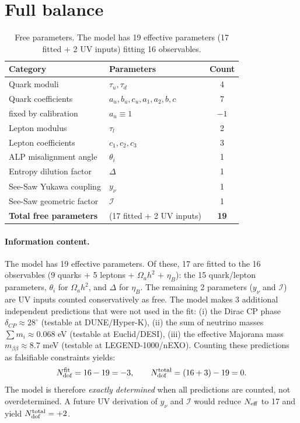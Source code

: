 \documentclass[12pt,a4paper]{article}
\numberwithin{equation}{section}
\begin{document}
\section{Full balance}
\label{sec:balance}
\begin{table}[H]
\centering
\caption{Free parameters. The model has 19 effective parameters (17 fitted + 2 UV inputs) fitting 16 observables.}
\begin{tabular}{llc}
\toprule
Category & Parameters & Count \\
\midrule
Quark moduli & \(\tau_u, \tau_d\) & 4 \\
Quark coefficients & \(a_u, b_u, c_u, a_1, a_2, b, c\) & 7 \\
\quad fixed by calibration & \(a_u \equiv 1\) & \(-1\) \\
Lepton modulus & \(\tau_l\) & 2 \\
Lepton coefficients & \(c_1, c_2, c_3\) & 3 \\
ALP misalignment angle & \(\theta_i\) & 1 \\
Entropy dilution factor & \(\Delta\) & 1 \\
See-Saw Yukawa coupling & \(y_\nu\) & 1 \\
See-Saw geometric factor & \(\mathcal{I}\) & 1 \\
\midrule
\textbf{Total free parameters} & (17 fitted + 2 UV inputs) & \textbf{19} \\
\bottomrule
\end{tabular}
\end{table}

\paragraph{Information content.}
The model has 19 effective parameters. Of these, 17 are fitted to the 16 observables (9 quarks + 5 leptons + \(\Omega_a h^2\) + \(\eta_B\)): the 15 quark/lepton parameters, \(\theta_i\) for \(\Omega_a h^2\), and \(\Delta\) for \(\eta_B\). The remaining 2 parameters (\(y_\nu\) and \(\mathcal{I}\)) are UV inputs counted conservatively as free. The model makes 3 additional independent predictions that were not used in the fit:
(i) the Dirac CP phase \(\delta_{CP} \approx 28^\circ\) (testable at DUNE/Hyper-K),
(ii) the sum of neutrino masses \(\sum m_i \approx 0.068\) eV (testable at Euclid/DESI),
(iii) the effective Majorana mass \(m_{\beta\beta} \approx 8.7\) meV (testable at LEGEND-1000/nEXO).
Counting these predictions as falsifiable constraints yields:
\begin{equation}
N_{\rm dof}^{\rm fit} = 16 - 19 = -3, \qquad
N_{\rm dof}^{\rm total} = (16+3) - 19 = 0.
\end{equation}
The model is therefore \emph{exactly determined} when all predictions are counted, not overdetermined. A future UV derivation of \(y_\nu\) and \(\mathcal{I}\) would reduce \(N_{\rm eff}\) to 17 and yield \(N_{\rm dof}^{\rm total}=+2\).
\end{document}
